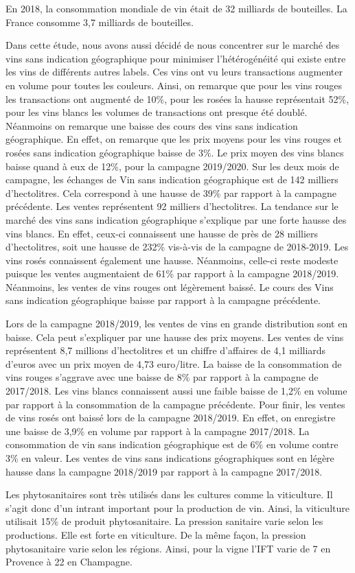 \documentclass[11pt, a4paper]{article}
\begin{document}
En 2018,  la consommation mondiale de vin était de 32 milliards de bouteilles. 
La France consomme 3,7 milliards de bouteilles.
\par
Dans cette étude, nous avons aussi décidé de nous concentrer sur le marché des vins sans indication géographique pour minimiser l’hétérogénéité qui existe entre les vins de différents autres labels. 
Ces vins ont vu leurs transactions augmenter en volume pour toutes les couleurs. 
Ainsi, on remarque que pour les vins rouges les transactions ont augmenté de 10\%, pour les rosées la hausse représentait 52\%, pour les vins blancs les volumes de transactions ont presque été doublé. 
Néanmoins on remarque une baisse des cours des vins sans indication géographique. 
En effet, on remarque que les prix moyens pour les vins rouges et rosées sans indication géographique baisse de 3\%. 
Le prix moyen des vins blancs baisse quand à eux de 12\%, pour la campagne 2019/2020. 
Sur les deux mois de campagne, les échanges de Vin sans indication géographique est de 142 milliers d’hectolitres. 
Cela correspond à une hausse de 39\% par rapport à la campagne précédente. 
Les ventes représentent 92 milliers d’hectolitres. 
La tendance sur le marché des vins sans indication géographique s’explique par une forte hausse des vins blancs. 
En effet, ceux-ci connaissent une hausse de près de 28 milliers d’hectolitres, soit une hausse de 232\% vis-à-vis de la campagne de 2018-2019. Les vins rosés connaissent également une hausse. 
Néanmoins, celle-ci reste modeste puisque les ventes augmentaient de 61\% par rapport à la campagne 2018/2019. 
Néanmoins, les ventes de vins rouges ont légèrement baissé. 
Le cours des Vins sans indication géographique baisse par rapport à la campagne précédente. 
\par
Lors de la campagne 2018/2019, les ventes de vins en grande distribution sont en baisse. 
Cela peut s’expliquer par une hausse des prix moyens. 
Les ventes de vins représentent 8,7 millions d’hectolitres et un chiffre d’affaires de 4,1 milliards d’euros avec un prix moyen de 4,73 euro/litre. 
La baisse de la consommation de vins rouges s’aggrave avec une baisse de 8\% par rapport à la campagne de 2017/2018. 
Les vins blancs connaissent aussi une faible baisse de 1,2\% en volume par rapport à la consommation de la campagne précédente. 
Pour finir, les ventes de vins rosés ont baissé lors de la campagne 2018/2019. 
En effet, on enregistre une baisse de 3,9\% en volume par rapport à la campagne 2017/2018. 
La consommation de vin sans indication géographique est de 6\% en volume contre 3\% en valeur. 
Les ventes de vins sans indications géographiques sont en légère hausse dans la campagne 2018/2019 par rapport à la campagne 2017/2018. 
\par
Les phytosanitaires sont très utilisés dans les cultures comme la viticulture. 
Il s’agit donc d’un intrant important pour la production de vin. Ainsi, la viticulture utilisait 15\% de produit phytosanitaire. 
La pression sanitaire varie selon les productions. 
Elle est forte en viticulture. 
De la même façon, la pression phytosanitaire varie selon les régions. 
Ainsi, pour la vigne l’IFT varie de 7 en Provence à 22 en Champagne.
\end{document}
